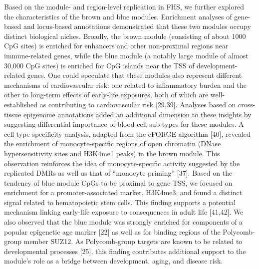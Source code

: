 \documentclass[]{bmcart}
\theoremstyle{definition}
\theoremstyle{definition}
\theoremstyle{definition}
\theoremstyle{remark}
\begin{document}
Based on the module- and region-level replication in FHS, we further
explored the characteristics of the brown and blue modules. Enrichment
analyses of gene-based and locus-based annotations demonstrated that
these two modules occupy distinct biological niches. Broadly, the brown
module (consisting of about 1000 CpG sites) is enriched for enhancers
and other non-proximal regions near immune-related genes, while the blue
module (a notably large module of almost 30,000 CpG sites) is enriched
for CpG islands near the TSS of development-related genes. One could
speculate that these modules also represent different mechanisms of
cardiovascular risk: one related to inflammatory burden and the other to
long-term effects of early-life exposures, both of which are
well-established as contributing to cardiovascular risk {[}29,39{]}.
Analyses based on cross-tissue epigenome annotations added an additional
dimension to these insights by suggesting differential importance of
blood cell sub-types for these modules. A cell type specificity
analysis, adapted from the eFORGE algorithm {[}40{]}, revealed the
enrichment of monocyte-specific regions of open chromatin (DNase
hypersensitivity sites and H3K4me1 peaks) in the brown module. This
observation reinforces the idea of monocyte-specific activity suggested
by the replicated DMRs as well as that of ``monocyte priming'' {[}37{]}.
Based on the tendency of blue module CpGs to be proximal to gene TSS, we
focused on enrichment for a promoter-associated marker, H3K4me3, and
found a distinct signal related to hematopoietic stem cells. This
finding supports a potential mechanism linking early-life exposure to
consequences in adult life {[}41,42{]}. We also observed that the blue
module was strongly enriched for components of a popular epigenetic age
marker {[}22{]} as well as for binding regions of the Polycomb-group
member SUZ12. As Polycomb-group targets are known to be related to
developmental processes {[}25{]}, this finding contributes additional
support to the module's role as a bridge between development, aging, and
disease risk.
\end{document}
